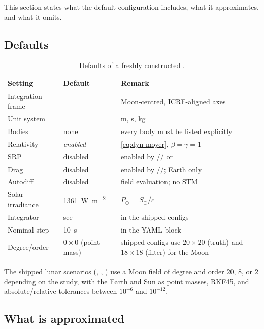 This section states what the default configuration includes, what it
approximates, and what it omits.

\subsection{Defaults}

\begin{table}[H]
  \centering
  \caption{Defaults of a freshly constructed .}
  \label{tab:dyn-defaults}
  \begin{tabularx}{\textwidth}{llL}
    \toprule
    Setting & Default & Remark \\
    \midrule
    Integration frame &  & Moon-centred, ICRF-aligned axes \\
    Unit system &  & \si{\meter}, \si{\second}, \si{\kilogram} \\
    Bodies & none & every body must be listed explicitly \\
    Relativity & \emph{enabled} & \cref{eq:dyn-moyer}, $\beta=\gamma=1$ \\
    SRP & disabled & enabled by // or  \\
    Drag & disabled & enabled by //; Earth only \\
    Autodiff & disabled &  field evaluation; no STM \\
    Solar irradiance & \SI{1361}{\watt\per\meter\squared} & $P_\odot = S_\odot/c$ \\
    Integrator & see  &  in the shipped configs \\
    Nominal step & \SI{10}{\second} &  in the YAML block \\
    Degree/order & $0\times0$ (point mass) & shipped configs use $20\times20$ (truth) and $18\times18$ (filter) for the Moon \\
    \bottomrule
  \end{tabularx}
\end{table}

The shipped lunar scenarios (,
, ) use a
Moon field of degree and order $20$, $8$, or $2$ depending on the study, with the
Earth and Sun as point masses, RKF45, and absolute/relative tolerances between
$10^{-6}$ and $10^{-12}$.

\subsection{What is approximated}

